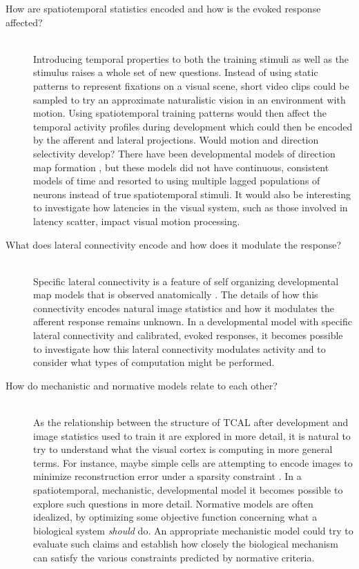 \documentclass[phd,ianc,twoside]{infthesis}
\begin{document}
\begin{description}
\item[How are spatiotemporal statistics encoded and how is the evoked
  response affected?] \hfill \\ Introducing temporal properties to both
  the training stimuli as well as the stimulus raises a whole set of new
  questions. Instead of using static patterns to represent fixations on a
  visual scene, short video clips could be sampled to try an approximate
  naturalistic vision in an environment with motion. Using spatiotemporal training patterns would then
  affect the temporal activity profiles during development which could
  then be encoded by the afferent and lateral projections. Would motion
  and direction selectivity develop? There have been developmental
  models of direction map formation \citep{miikkulainen_2005}, but these
  models did not have continuous, consistent models of time and resorted to using
  multiple lagged populations of neurons instead of true spatiotemporal
  stimuli. It would also be interesting to investigate how latencies in the
  visual system, such as those involved in latency scatter, impact visual
  motion processing.

\item[What does lateral connectivity encode and how does it modulate the
  response?] \hfill \\ Specific lateral connectivity is a feature of
  self organizing developmental map models
  \citep{miikkulainen_2005,stevens_jn13} that is observed anatomically
  \citep{buzas_compneurol06}. The details of how this connectivity
  encodes natural image statistics and how it modulates the afferent
  response remains unknown. In a developmental model with specific
  lateral connectivity and calibrated, evoked responses, it becomes
  possible to investigate how this lateral connectivity modulates
  activity and to consider what types of computation might be performed.

\item[How do mechanistic and normative models relate to each other?
]\hfill \\ As the relationship between the structure of TCAL after
  development and image statistics used to train it are explored in more
  detail, it is natural to try to understand what the visual cortex is
  computing in more general terms. For instance, maybe simple cells are
  attempting to encode images to minimize reconstruction error under a
  sparsity constraint \citep{olshausen_nature96}. In a spatiotemporal,
  mechanistic, developmental model it becomes possible to explore such
  questions in more detail. Normative models are often idealized, by
  optimizing some objective function concerning what a biological
  system \emph{should} do. An appropriate mechanistic model could try to
  evaluate such claims and establish how closely the biological
  mechanism can satisfy the various constraints predicted by normative criteria.
\end{description}
\end{document}
